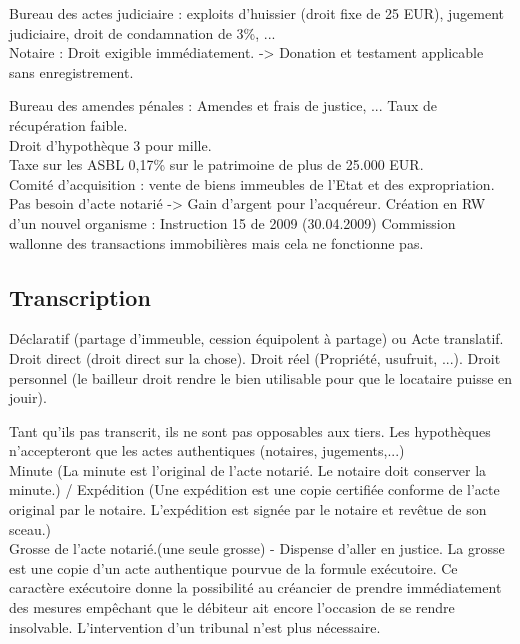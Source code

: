 \documentclass{book}
\begin{document}
Bureau des actes judiciaire : exploits d'huissier (droit fixe de 25 EUR), jugement judiciaire, droit de condamnation de 3\%, ...\\

Notaire : Droit exigible immédiatement. -> Donation et testament applicable sans enregistrement.

Bureau des amendes pénales : Amendes et frais de justice, ... Taux de récupération faible.\\

Droit d'hypothèque 3 pour mille.\\

Taxe sur les ASBL 0,17\% sur le patrimoine de plus de 25.000 EUR.\\ 

Comité d'acquisition : vente de biens immeubles de l'Etat et des expropriation. Pas besoin d'acte notarié -> Gain d'argent pour l'acquéreur. Création en RW d'un nouvel organisme : Instruction 15 de 2009 (30.04.2009) Commission wallonne des transactions immobilières mais cela ne fonctionne pas.

\subsection{Transcription}

Déclaratif (partage d'immeuble, cession équipolent à partage) ou Acte translatif. 
Droit direct (droit direct sur la chose). Droit réel (Propriété, usufruit, ...). Droit personnel (le bailleur droit rendre le bien utilisable pour que le locataire puisse en jouir).

Tant qu'ils pas transcrit, ils ne sont pas opposables aux tiers. Les hypothèques n'accepteront que les actes authentiques (notaires, jugements,...)\\

Minute (La minute est l'original de l'acte notarié. Le notaire doit conserver la minute.) / Expédition (Une expédition est une copie certifiée conforme de l'acte original par le notaire. L'expédition est signée par le notaire et revêtue de son sceau.)\\

Grosse de l'acte notarié.(une seule grosse) - Dispense d'aller en justice. La grosse est une copie d'un acte authentique pourvue de la formule exécutoire. Ce caractère exécutoire donne la possibilité au créancier de prendre immédiatement des mesures empêchant que le débiteur ait encore l'occasion de se rendre insolvable. L'intervention d'un tribunal n'est plus nécessaire.\\
\end{document}

